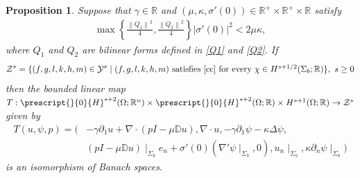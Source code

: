 \documentclass[11pt,letterpaper,reqno]{amsart}
\newtheorem{proposition}[theorem]{Proposition}
\numberwithin{equation}{section}
\newcommand{\abs}[1]{\left\lvert#1\right\rvert}
\newcommand{\norm}[1]{\left\lVert#1\right\rVert}
\begin{document}
\begin{proposition} \label{Zsiso}
    Suppose that \(\gamma\in \mathbb{R}\) and \((\mu,\kappa,\sigma'(0)) \in \mathbb{R}^{+} \times \mathbb{R}^{+} \times \mathbb{R}\) satisfy
    \begin{align}
        \max\left\{\frac{\norm{Q_{1}}^{2}}{4},\frac{\norm{Q_{2}}^{2}}{4}\right\} \abs{\sigma'(0)}^{2}< 2\mu\kappa,
    \end{align}
    where \(Q_{1}\) and \(Q_{2}\) are bilinear forms defined in \eqref{Q1} and \eqref{Q2}. If
    \begin{align} \label{Zs}
        \mathcal{Z}^{s}=\{(f,g,l,k,h,m) \in \mathcal{Y}^{s}\mid \mbox{\((f,g,l,k,h,m)\) satisfies \eqref{cc} for every \(\chi \in H^{s+1/2}(\Sigma_{b};\mathbb{R})\)}\},\text{ } s \geq 0
    \end{align}
    then the bounded linear map \(T: \prescript{}{0}{H}^{s+2}(\Omega;\mathbb{R}^{n}) \times \prescript{}{0}{H}^{s+2}(\Omega;\mathbb{R})\times H^{s+1}(\Omega;\mathbb{R}) \to \mathcal{Z}^{s}\) given by
    \begin{align}
        T(u,\psi,p)=(&-\gamma \partial_{1}u + \nabla \cdot (pI-\mu\mathbb{D}u), \nabla \cdot u, -\gamma \partial_{1}\psi -\kappa\Delta\psi, \nonumber \\
        &(pI-\mu\mathbb{D}u) \mid_{\Sigma_{b}} e_{n} +\sigma'(0)(\nabla'\psi \mid_{\Sigma_{b}},0), u_{n} \mid_{\Sigma_{b}}, \kappa\partial_{n}\psi \mid_{\Sigma_{b}})
    \end{align}
    is an isomorphism of Banach spaces.
\end{proposition}
\end{document}

